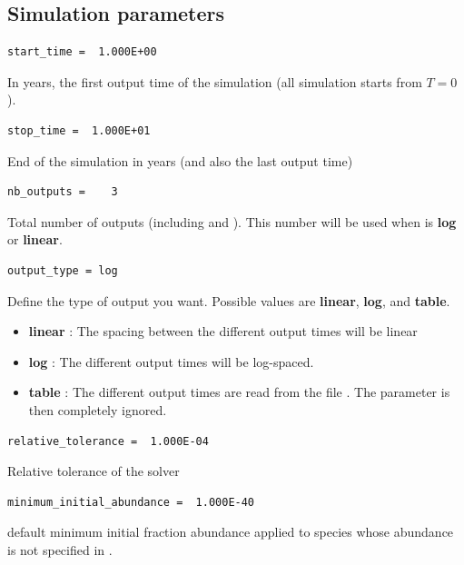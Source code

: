 \documentclass[english,a4paper,twoside]{article}
\begin{document}
\subsection{Simulation parameters}
\begin{verbatim}
start_time =  1.000E+00
\end{verbatim}
In years, the first output time of the simulation (all simulation starts from $T=0$).

\begin{verbatim}
stop_time =  1.000E+01
\end{verbatim}
End of the simulation in years (and also the last output time)

\begin{verbatim}
nb_outputs =    3
\end{verbatim}
Total number of outputs (including  and ). This number will be used when  is \textbf{log} or \textbf{linear}.

\begin{verbatim}
output_type = log
\end{verbatim}
Define the type of output you want. Possible values are \textbf{linear}, \textbf{log}, and \textbf{table}. 
\begin{itemize}
\item \textbf{linear} : The spacing between the different output times will be linear
\item \textbf{log} : The different output times will be log-spaced.
\item \textbf{table} : The different output times are read from the file . The parameter  is then completely ignored.
\end{itemize}

\begin{verbatim}
relative_tolerance =  1.000E-04
\end{verbatim}
Relative tolerance of the solver

\begin{verbatim}
minimum_initial_abundance =  1.000E-40
\end{verbatim}
default minimum initial fraction abundance applied to species whose abundance is not specified in .
\end{document}
